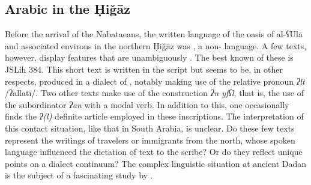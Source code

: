 \documentclass[output=paper]{langsci/langscibook}
\begin{document}
\subsection{Arabic in the Ḥiǧāz}
Before the arrival of the Nabataeans, the written language of the oasis of al-ʕUlā and associated environs in the northern Ḥiǧāz was , a non-  language. A few texts, however, display features that are unambiguously . The best known of these is JSLih 384. This short text is written in the  script but seems to be, in other respects, produced in a dialect of  , notably making use of the {relative} pronoun \textit{ʔlt} /ʔallatī/. Two other  texts make use of the  construction \textit{ʔn yfʕl}, that is, the use of the subordinator \textit{ʔan} with a {modal} verb. In addition to this, one occasionally finds the \textit{ʔ(l)} {definite} {article} employed in these inscriptions. The interpretation of this contact situation, like that in South Arabia, is unclear. Do these few texts represent the writings of travelers or immigrants from the north, whose spoken language influenced the dictation of text to the scribe? Or do they reflect unique points on a dialect continuum? The complex linguistic situation at ancient Dadan is the subject of a fascinating study by \citet{Kootstra2019}.
\end{document}
